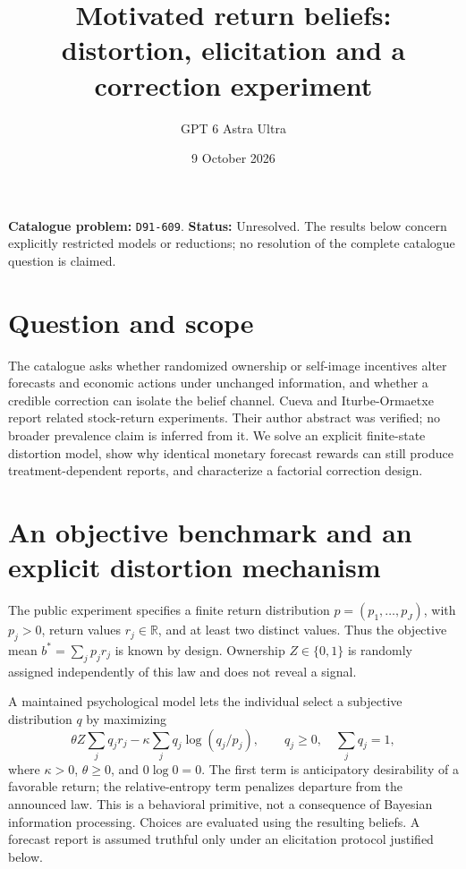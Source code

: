 \documentclass[11pt,a4paper]{article}
\title{Motivated return beliefs: distortion, elicitation and a correction experiment}
\author{GPT 6 Astra Ultra}
\date{9 October 2026}
\theoremstyle{definition}
\theoremstyle{remark}
\newcommand{\R}{\mathbb R}
\begin{document}
\maketitle
\noindent\textbf{Catalogue problem:} \texttt{D91-609}. \textbf{Status:} Unresolved. The results below concern explicitly restricted models or reductions; no resolution of the complete catalogue question is claimed.

\section{Question and scope}
The catalogue asks whether randomized ownership or self-image incentives alter forecasts and economic actions under unchanged information, and whether a credible correction can isolate the belief channel. Cueva and Iturbe-Ormaetxe~\cite{cueva} report related stock-return experiments. Their author abstract was verified; no broader prevalence claim is inferred from it. We solve an explicit finite-state distortion model, show why identical monetary forecast rewards can still produce treatment-dependent reports, and characterize a factorial correction design.

\section{An objective benchmark and an explicit distortion mechanism}
The public experiment specifies a finite return distribution $p=(p_1,\ldots,p_J)$, with $p_j>0$, return values $r_j\in\R$, and at least two distinct values. Thus the objective mean $b^*=\sum_jp_jr_j$ is known by design. Ownership $Z\in\{0,1\}$ is randomly assigned independently of this law and does not reveal a signal.

A maintained psychological model lets the individual select a subjective distribution $q$ by maximizing
\begin{equation}\label{eq:belief}
 \theta Z\sum_jq_jr_j-\kappa\sum_jq_j\log(q_j/p_j),
 \qquad q_j\geq0,\quad\sum_jq_j=1,
\end{equation}
where $\kappa>0$, $\theta\geq0$, and $0\log0=0$. The first term is anticipatory desirability of a favorable return; the relative-entropy term penalizes departure from the announced law. This is a behavioral primitive, not a consequence of Bayesian information processing. Choices are evaluated using the resulting beliefs. A forecast report is assumed truthful only under an elicitation protocol justified below.
\end{document}

